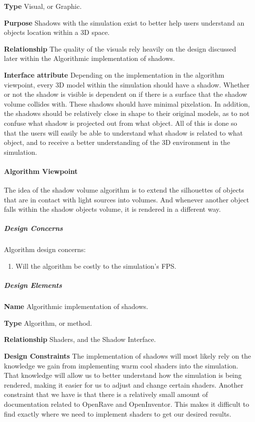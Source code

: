 \begin{flushleft}
\textbf{Type}
Visual, or Graphic.

\textbf{Purpose}
Shadows with the simulation exist to better help users understand an objects location within a 3D space.

\textbf{Relationship}
The quality of the visuals rely heavily on the design discussed later within the Algorithmic implementation of shadows.

\textbf{Interface attribute}
Depending on the implementation in the algorithm viewpoint, every 3D model within the simulation should have a shadow.
Whether or not the shadow is visible is dependent on if there is a surface that the shadow volume collides with.
These shadows should have minimal pixelation.
In addition, the shadows should be relatively close in shape to their original models, as to not confuse what shadow is projected out from what object.
All of this is done so that the users will easily be able to understand what shadow is related to what object, and to receive a better understanding of the 3D environment in the simulation.

\newpage

\paragraph{Algorithm Viewpoint}
The idea of the shadow volume algorithm is to extend the silhouettes of objects that are in contact with light sources into volumes.
And whenever another object falls within the shadow objects volume, it is rendered in a different way. \cite{shadow}

\subparagraph{Design Concerns}
Algorithm design concerns:
\begin{enumerate}
\item Will the algorithm be costly to the simulation's FPS.
\end{enumerate}

\subparagraph{Design Elements}
\textbf{Name}
Algorithmic implementation of shadows.

\textbf{Type}
Algorithm, or method.

\textbf{Relationship}
Shaders, and the Shadow Interface.

\textbf{Design Constraints}
The implementation of shadows will most likely rely on the knowledge we gain from implementing warm cool shaders into the simulation.
That knowledge will allow us to better understand how the simulation is being rendered, making it easier for us to adjust and change certain shaders.
Another constraint that we have is that there is a relatively small amount of documentation related to OpenRave and OpenInventor.
This makes it difficult to find exactly where we need to implement shaders to get our desired results.


\end{flushleft}

